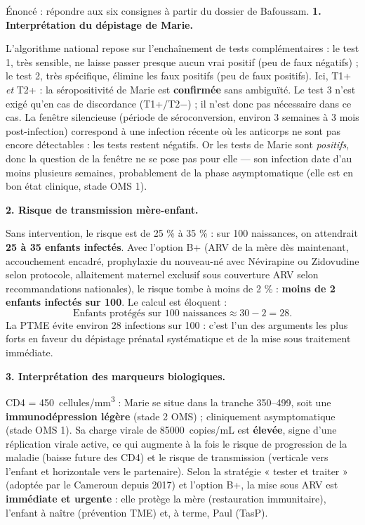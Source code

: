 \documentclass[11pt]{article}
\newcommand{\cle}[1]{{\popxbold\color{popdark}#1}}
\newcounter{popsec}
\newcounter{popsub}
\newcommand{\courssub}[1]{%
  \stepcounter{popsub}%
  \par\vspace{9pt}\noindent{\popxbold\fontsize{11.5}{13}\selectfont\color{popink}{\color{poporange}\thepopsec.\thepopsub}\hspace{6pt}#1}\par\nopagebreak\vspace{4pt}
}
\begin{document}
\courssub{Démarche et corrigé commenté}

\begin{exoresolu}
Énoncé : répondre aux six consignes à partir du dossier de Bafoussam.
\tcblower
\textbf{1. Interprétation du dépistage de Marie.}

L'algorithme national repose sur l'enchaînement de tests complémentaires : le test 1, très sensible, ne laisse passer presque aucun vrai positif (peu de faux négatifs) ; le test 2, très spécifique, élimine les faux positifs (peu de faux positifs). Ici, T1+ \emph{et} T2+ : la séropositivité de Marie est \textbf{confirmée} sans ambiguïté. Le test 3 n'est exigé qu'en cas de discordance (T1+/T2$-$) ; il n'est donc pas nécessaire dans ce cas. La \cle{fenêtre silencieuse} (période de séroconversion, environ 3 semaines à 3 mois post-infection) correspond à une infection récente où les anticorps ne sont pas encore détectables : les tests restent négatifs. Or les tests de Marie sont \emph{positifs}, donc la question de la fenêtre ne se pose pas pour elle — son infection date d'au moins plusieurs semaines, probablement de la phase asymptomatique (elle est en bon état clinique, stade OMS 1).

\textbf{2. Risque de transmission mère-enfant.}

Sans intervention, le risque est de 25 \% à 35 \% : sur 100 naissances, on attendrait \textbf{25 à 35 enfants infectés}. Avec l'option B+ (ARV de la mère dès maintenant, accouchement encadré, prophylaxie du nouveau-né avec Névirapine ou Zidovudine selon protocole, allaitement maternel exclusif sous couverture ARV selon recommandations nationales), le risque tombe à moins de 2 \% : \textbf{moins de 2 enfants infectés sur 100}. Le calcul est éloquent :
\[ \text{Enfants protégés sur 100 naissances} \approx 30 - 2 = 28. \]
La PTME évite environ 28 infections sur 100 : c'est l'un des arguments les plus forts en faveur du dépistage prénatal systématique et de la mise sous traitement immédiate.

\textbf{3. Interprétation des marqueurs biologiques.}

CD4 = \SI{450}{cellules/mm^3} : Marie se situe dans la tranche 350--499, soit une \textbf{immunodépression légère} (stade 2 OMS) ; cliniquement asymptomatique (stade OMS 1). Sa charge virale de \SI{85 000}{copies/mL} est \textbf{élevée}, signe d'une réplication virale active, ce qui augmente à la fois le risque de progression de la maladie (baisse future des CD4) et le risque de transmission (verticale vers l'enfant et horizontale vers le partenaire). Selon la stratégie « tester et traiter » (adoptée par le Cameroun depuis 2017) et l'option B+, la mise sous ARV est \textbf{immédiate et urgente} : elle protège la mère (restauration immunitaire), l'enfant à naître (prévention TME) et, à terme, Paul (TasP).


\end{exoresolu}
\end{document}
